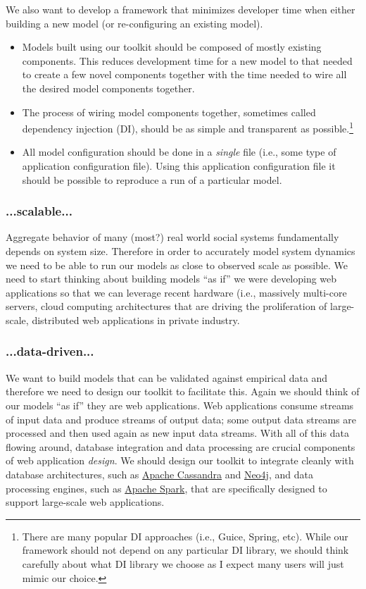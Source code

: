 \documentclass[11pt]{amsart}
\begin{document}
We also want to develop a framework that minimizes developer time when either building a new model (or re-configuring an existing model).
\begin{itemize}
    \item Models built using our toolkit should be composed of mostly existing components. This reduces development time for a new model to that needed to create a few novel components together with the time needed to wire all the desired model components together.
    \item The process of wiring model components together, sometimes called dependency injection (DI), should be as simple and transparent as possible.\footnote{
    There are many popular DI approaches (i.e., Guice, Spring, etc). While our framework should not depend on any particular DI library, we should think carefully about what DI library we choose as I expect many users will just mimic our choice.
    }
    \item All model configuration should be done in a \textit{single} file (i.e., some type of application configuration file).  Using this application configuration file it should be possible to reproduce a run of a particular model.
\end{itemize}

\subsubsection{...scalable...}
Aggregate behavior of many (most?) real world social systems fundamentally depends on system size. Therefore in order to accurately model system dynamics we need to be able to run our models as close to observed scale as possible. We need to start thinking about building models ``as if'' we were developing web applications so that we can leverage recent hardware (i.e., massively multi-core servers, cloud computing architectures that are driving the proliferation of large-scale, distributed web applications in private industry.

\subsubsection{...data-driven...}
We want to build models that can be validated against empirical data and therefore we need to design our toolkit to facilitate this.  Again we should think of our models ``as if'' they are web applications. Web applications consume streams of input data and produce streams of output data; some output data streams are processed and then used again as new input data streams. With all of this data flowing around, database integration and data processing are crucial components of web application \textit{design}. We should design our toolkit to integrate cleanly with database architectures, such as \href{http://cassandra.apache.org/}{Apache Cassandra} and \href{http://neo4j.com/}{Neo4j}, and data processing engines, such as \href{http://spark.apache.org/}{Apache Spark}, that are specifically designed to support large-scale web applications.
\end{document}
